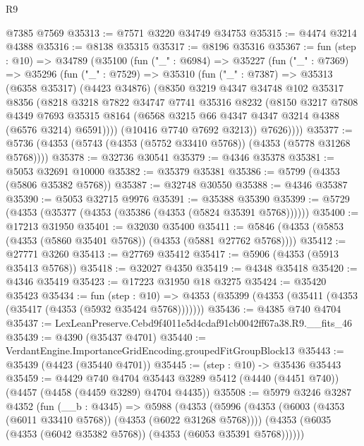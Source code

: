 \begin{lexlean}{R9}
\begin{coremodule}
    @7385
    @7569
@35313 := @7571 @3220 @34749 @34753
@35315 := @4474 @3214 @4388
@35316 := @8138 @35315
@35317 := @8196 @35316
@35367 := fun (step : @10) =>
  @34789
    (@35100
      (fun ("_" : @6984) =>
      @35227
        (fun ("_" : @7369) =>
        @35296
          (fun ("_" : @7529) =>
          @35310
            (fun ("_" : @7387) =>
            @35313
              (@6358 @35317)
              (@4423 @34876)
              (@8350
                @3219
                @4347
                @34748
                @102
                @35317
                @8356
                (@8218
                  @3218
                  @7822
                  @34747
                  @7741
                  @35316
                  @8232
                  (@8150
                    @3217
                    @7808
                    @4349
                    @7693
                    @35315
                    @8164
                    (@6568 @3215 @66 @4347 @4347 @3214 @4388 (@6576 @3214) @6591))))
              (@10416 @7740 @7692 @3213))
            @7626))))
@35377 := @5736 (@4353 (@5743 (@4353 (@5752 @33410 @5768)) (@4353 (@5778 @31268 @5768))))
@35378 := @32736 @30541
@35379 := @4346 @35378
@35381 := @5053 @32691 @10000
@35382 := @35379 @35381
@35386 := @5799 (@4353 (@5806 @35382 @5768))
@35387 := @32748 @30550
@35388 := @4346 @35387
@35390 := @5053 @32715 @9976
@35391 := @35388 @35390
@35399 := @5729 (@4353 (@35377 (@4353 (@35386 (@4353 (@5824 @35391 @5768))))))
@35400 := @17213 @31950
@35401 := @32030 @35400
@35411 := @5846 (@4353 (@5853 (@4353 (@5860 @35401 @5768)) (@4353 (@5881 @27762 @5768))))
@35412 := @27771 @3260
@35413 := @27769 @35412
@35417 := @5906 (@4353 (@5913 @35413 @5768))
@35418 := @32027 @4350
@35419 := @4348 @35418
@35420 := @4346 @35419
@35423 := @17223 @31950 @18 @3275
@35424 := @35420 @35423
@35434 := fun (step : @10) =>
  @4353 (@35399 (@4353 (@35411 (@4353 (@35417 (@4353 (@5932 @35424 @5768)))))))
@35436 := @4385 @740 @4704
@35437 := LexLeanPreserve.Cebd9f4011e5d4cdaf91cb0042ff67a38.R9.__fits_46
@35439 := @4390 (@35437 @4701)
@35440 := VerdantEngine.ImportanceGridEncoding.groupedFitGroupBlock13
@35443 := @35439 (@4423 (@35440 @4701))
@35445 := (step : @10) -> @35436 @35443
@35459 := @4429
    @740
    @4704
    @35443
    @3289
    @5412
    (@4440 (@4451 @740))
    (@4457 (@4458 (@4459 @3289) @4704 @4435))
@35508 := @5979
    @3246
    @3287
    @4352
    (fun (__b : @4345) =>
    @5988
      (@4353
        (@5996
          (@4353 (@6003 (@4353 (@6011 @33410 @5768)) (@4353 (@6022 @31268 @5768))))
          (@4353 (@6035 (@4353 (@6042 @35382 @5768)) (@4353 (@6053 @35391 @5768))))))

\end{coremodule}
\end{lexlean}
